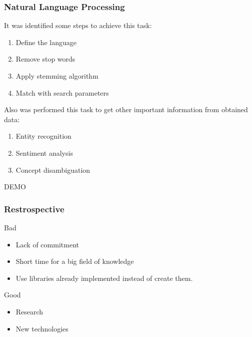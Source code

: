 \documentclass{beamer}
\begin{document}
\begin{frame}
\frametitle{Natural Language Processing}
It was identified some steps to achieve this task:
\begin{enumerate}
\item Define the language
\item Remove stop words
\item Apply stemming algorithm
\item Match with search parameters
\end{enumerate}
Also was performed this task to get other important information from obtained data:
\begin{enumerate}
\item Entity recognition
\item Sentiment analysis
\item Concept disambiguation
\end{enumerate}
\end{frame}

\begin{frame}
\begin{center}
DEMO
\end{center}
\end{frame}

\begin{frame}
\frametitle{Restrospective}
Bad
\begin{itemize}
\item Lack of commitment
\item Short time for a big field of knowledge
\item Use libraries already implemented instead of create them.
\end{itemize}
Good
\begin{itemize}
\item Research
\item New technologies
\end{itemize}
\end{frame}
\end{document}
